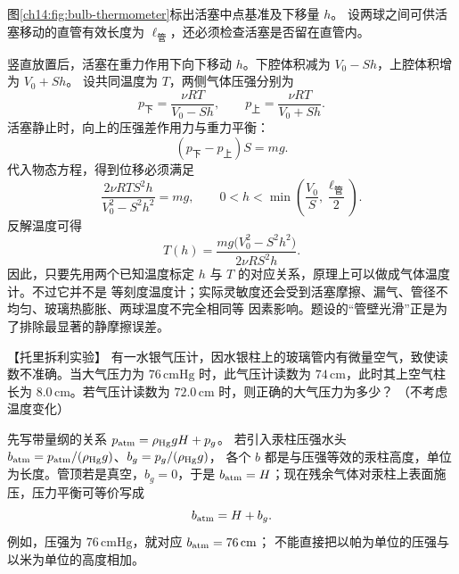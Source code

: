 {\begin{xesolution}
图\ref{ch14:fig:bulb-thermometer}标出活塞中点基准及下移量 $h$。
设两球之间可供活塞移动的直管有效长度为 $\ell_{\text{管}}$，还必须检查活塞是否留在直管内。
\bulbThermometerDiagram

竖直放置后，活塞在重力作用下向下移动 $h$。下腔体积减为 $V_0-Sh$，上腔体积增为 $V_0+Sh$。
设共同温度为 $T$，两侧气体压强分别为
\begin{equation}
  p_{\text{下}}=\frac{\nu RT}{V_0-Sh},\qquad
  p_{\text{上}}=\frac{\nu RT}{V_0+Sh}.
\end{equation}
活塞静止时，向上的压强差作用力与重力平衡：
\begin{equation}
  (p_{\text{下}}-p_{\text{上}})S=mg.
\end{equation}
代入物态方程，得到位移必须满足
\begin{equation}
  \boxed{\frac{2\nu RTS^2h}{V_0^2-S^2h^2}=mg},
  \qquad 0<h<\min\left(\frac{V_0}{S},\frac{\ell_{\text{管}}}2\right).
\end{equation}
反解温度可得
\begin{equation}
  \boxed{T(h)=\frac{mg\bigl(V_0^2-S^2h^2\bigr)}{2\nu RS^2h}}.
\end{equation}
因此，只要先用两个已知温度标定 $h$ 与 $T$ 的对应关系，原理上可以做成气体温度计。不过它并不是
等刻度温度计；实际灵敏度还会受到活塞摩擦、漏气、管径不均匀、玻璃热膨胀、两球温度不完全相同等
因素影响。题设的“管壁光滑”正是为了排除最显著的静摩擦误差。
\end{xesolution}

\begin{origexamplebox}{【托里拆利实验】}\label{ch14:ex:s28-19-5}
有一水银气压计，因水银柱上的玻璃管内有微量空气，致使读数不准确。当大气压力为
$76\,\mathrm{cmHg}$ 时，此气压计读数为 $74\,\mathrm{cm}$，此时其上空气柱长为
$8.0\,\mathrm{cm}$。若气压计读数为 $72.0\,\mathrm{cm}$ 时，则正确的大气压力为多少？
（不考虑温度变化）

\ThQBarometer
\end{origexamplebox}

\begin{xesolution}
先写带量纲的关系 $p_{\rm atm}=\rho_{\rm Hg}gH+p_g$。
若引入汞柱压强水头 $b_{\rm atm}=p_{\rm atm}/(\rho_{\rm Hg}g)$、$b_g=p_g/(\rho_{\rm Hg}g)$，
各个 $b$ 都是与压强等效的汞柱高度，单位为长度。管顶若是真空，$b_g=0$，于是
$b_{\rm atm}=H$；现在残余气体对汞柱上表面施压，压力平衡可等价写成
\begin{equation}
  b_{\rm atm}=H+b_g.
\end{equation}
例如，压强为 $76\,\mathrm{cmHg}$，就对应 $b_{\rm atm}=76\,\mathrm{cm}$；
不能直接把以帕为单位的压强与以米为单位的高度相加。


\end{xesolution}}
